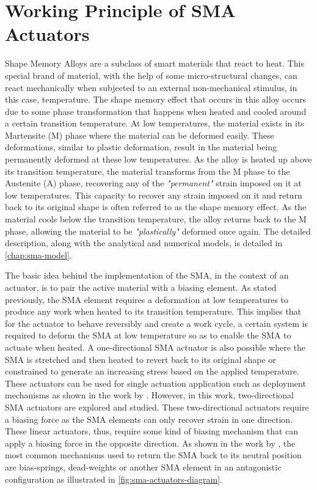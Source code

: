 \section{Working Principle of SMA Actuators}
Shape Memory Alloys are a subclass of smart materials that react to heat. This special brand of material, with the help of some micro-structural changes, can react mechanically when subjected to an external non-mechanical stimulus, in this case, temperature. The shape memory effect that occurs in this alloy occurs due to some phase transformation that happens when heated and cooled around a certain transition temperature. At low temperatures, the material exists in its Martensite (M) phase where the material can be deformed easily. These deformations, similar to plastic deformation, result in the material being permanently deformed at these low temperatures. As the alloy is heated up above its transition temperature, the material transforms from the M phase to the Austenite (A) phase, recovering any of the \textit{"permanent"} strain imposed on it at low temperatures. This capacity to recover any strain imposed on it and return back to its original shape is often referred to as the shape memory effect. As the material cools below the transition temperature, the alloy returns back to the M phase, allowing the material to be \textit{"plastically"} deformed once again. The detailed description, along with the analytical and numerical models, is detailed in \cref{chap:sma-model}.

The basic idea behind the implementation of the SMA, in the context of an actuator, is to pair the active material with a biasing element. As stated previously, the SMA element requires a deformation at low temperatures to produce any work when heated to its transition temperature. This implies that for the actuator to behave reversibly and create a work cycle, a certain system is required to deform the SMA at low temperature so as to enable the SMA to actuate when heated. A one-directional SMA actuator is also possible where the SMA is stretched and then heated to revert back to its original shape or constrained to generate an increasing stress based on the applied temperature. These actuators can be used for single actuation application such as deployment mechanisms as shown in the work by \cite{mohdjaniDesigningShapeMemory2017}. However, in this work, two-directional SMA actuators are explored and studied. These two-directional actuators require a biasing force as the SMA elements can only recover strain in one direction. These linear actuators, thus, require some kind of biasing mechanism that can apply a biasing force in the opposite direction. As shown in the work by \cite{bellouardShapeMemoryAlloys2008}, the most common mechanisms used to return the SMA back to its neutral position are bias-springs, dead-weights or another SMA element in an antagonistic configuration as illustrated in \cref{fig:sma-actuators-diagram}.

